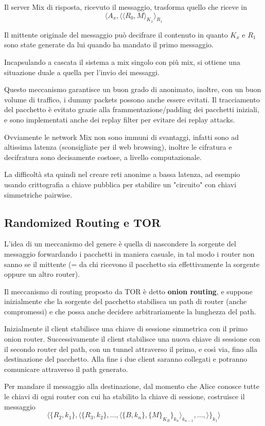 \documentclass[a4paper, 10pt, twoside]{article}
\begin{document}
	Il server Mix di risposta, ricevuto il messaggio, trasforma quello che riceve in \[\langle A_x,\langle\langle R_0, M\rangle_{K_x}\rangle_{R_1}\]

	Il mittente originale del messaggio può decifrare il contenuto in quanto $K_x$ e $R_1$ sono state generate da lui quando ha mandato il primo messaggio.

	Incapsulando a cascata il sistema a mix singolo con più mix, si ottiene una situazione duale a quella per l'invio dei messaggi.

	Questo meccanismo garantisce un buon grado di anonimato, inoltre, con un buon volume di traffico, i dummy packets possono anche essere evitati. Il tracciamento del pacchetto è evitato grazie alla frammentazione/padding dei pacchetti iniziali, e sono implementati anche dei replay filter per evitare dei replay attacks.

	Ovviamente le network Mix non sono immuni di svantaggi, infatti sono ad altissima latenza (sconsigliate per il web browsing), inoltre le cifratura e decifratura sono decisamente costose, a livello computazionale.

	La difficoltà sta quindi nel creare reti anonime a bassa latenza, ad esempio usando crittografia a chiave pubblica per stabilire un "circuito" con chiavi simmetriche pairwise.

	\subsection{Randomized Routing e TOR}
	L'idea di un meccanismo del genere è quella di nascondere la sorgente del messaggio forwardando i pacchetti in maniera casuale, in tal modo i router non sanno se il mittente (= da chi ricevono il pacchetto sia effettivamente la sorgente oppure un altro router).

	Il meccanismo di routing proposto da TOR è detto \textbf{onion routing}, e suppone inizialmente che la sorgente del pacchetto stabilisca un path di router (anche compromessi) e che possa anche decidere arbitrariamente la lunghezza del path.

	Inizialmente il client stabilisce una chiave di sessione simmetrica con il primo onion router.
	Successivamente il client stabilisce una nuova chiave di sessione con il secondo router del path, con un tunnel attraverso il primo, e così via, fino alla destinazione del pacchetto. Alla fine i due client saranno collegati e potranno comunicare attraverso il path generato.

	Per mandare il messaggio alla destinazione, dal momento che Alice conosce tutte le chiavi di ogni router con cui ha stabilito la chiave di sessione, costruisce il messaggio \[ \langle \lbrace R_2, k_1\rbrace , \langle\lbrace R_3, k_2\rbrace, \dots, \langle\lbrace B, k_n\rbrace,\lbrace M\rbrace_{K_B}\rbrace_{k_n}\rangle_{k_{n-1}}, \dots,\rangle \rbrace_{k_1}\rangle \]
\end{document}
